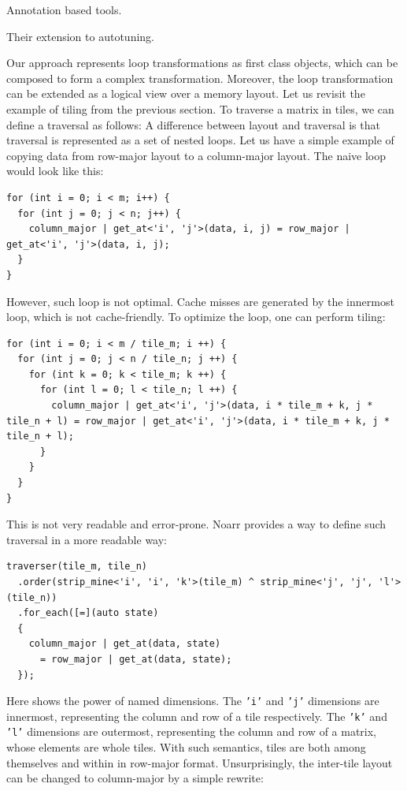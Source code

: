 Annotation based tools.

Their extension to autotuning.


Our approach represents loop transformations as first class objects, which can be composed to form a complex transformation. Moreover, the loop transformation can be extended as a logical view over a memory layout. Let us revisit the example of tiling from the previous section. To traverse a matrix in tiles, we can define a traversal as follows:
A difference between layout and traversal is that traversal is represented as a set of nested loops. Let us have a simple example of copying data from row-major layout to a column-major layout. The naive loop would look like this: 
\begin{verbatim}
for (int i = 0; i < m; i++) {
  for (int j = 0; j < n; j++) {   
    column_major | get_at<'i', 'j'>(data, i, j) = row_major | get_at<'i', 'j'>(data, i, j);
  }
}
\end{verbatim}
However, such loop is not optimal. Cache misses are generated by the innermost loop, which is not cache-friendly. To optimize the loop, one can perform tiling:
\begin{verbatim}
for (int i = 0; i < m / tile_m; i ++) {
  for (int j = 0; j < n / tile_n; j ++) {
    for (int k = 0; k < tile_m; k ++) {
      for (int l = 0; l < tile_n; l ++) {
        column_major | get_at<'i', 'j'>(data, i * tile_m + k, j * tile_n + l) = row_major | get_at<'i', 'j'>(data, i * tile_m + k, j * tile_n + l);
      }
    }
  }
}
\end{verbatim}
This is not very readable and error-prone. Noarr provides a way to define such traversal in a more readable way:
\begin{verbatim}
traverser(tile_m, tile_n)
  .order(strip_mine<'i', 'i', 'k'>(tile_m) ^ strip_mine<'j', 'j', 'l'>(tile_n))
  .for_each([=](auto state)
  {
    column_major | get_at(data, state) 
      = row_major | get_at(data, state);
  });
\end{verbatim}
Here shows the power of named dimensions. The \texttt{'i'} and \texttt{'j'} dimensions are innermost, representing the column and row of a tile respectively. The \texttt{'k'} and \texttt{'l'} dimensions are outermost, representing the column and row of a matrix, whose elements are whole tiles. With such semantics, tiles are both among themselves and within in row-major format. Unsurprisingly, the inter-tile layout can be changed to column-major by a simple rewrite:

